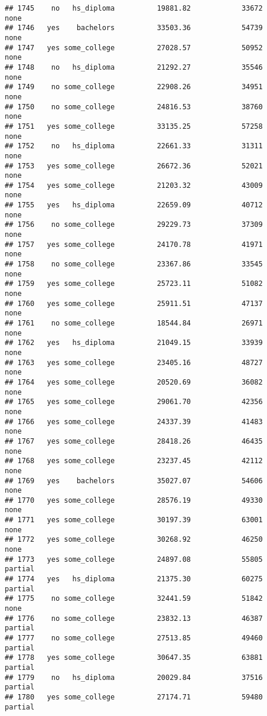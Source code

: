 \documentclass[
]{article}
\begin{document}
\begin{verbatim}
## 1745    no   hs_diploma          19881.82            33672        none
## 1746   yes    bachelors          33503.36            54739        none
## 1747   yes some_college          27028.57            50952        none
## 1748    no   hs_diploma          21292.27            35546        none
## 1749    no some_college          22908.26            34951        none
## 1750    no some_college          24816.53            38760        none
## 1751   yes some_college          33135.25            57258        none
## 1752    no   hs_diploma          22661.33            31311        none
## 1753   yes some_college          26672.36            52021        none
## 1754   yes some_college          21203.32            43009        none
## 1755   yes   hs_diploma          22659.09            40712        none
## 1756    no some_college          29229.73            37309        none
## 1757   yes some_college          24170.78            41971        none
## 1758    no some_college          23367.86            33545        none
## 1759   yes some_college          25723.11            51082        none
## 1760   yes some_college          25911.51            47137        none
## 1761    no some_college          18544.84            26971        none
## 1762   yes   hs_diploma          21049.15            33939        none
## 1763   yes some_college          23405.16            48727        none
## 1764   yes some_college          20520.69            36082        none
## 1765   yes some_college          29061.70            42356        none
## 1766   yes some_college          24337.39            41483        none
## 1767   yes some_college          28418.26            46435        none
## 1768   yes some_college          23237.45            42112        none
## 1769   yes    bachelors          35027.07            54606        none
## 1770   yes some_college          28576.19            49330        none
## 1771   yes some_college          30197.39            63001        none
## 1772   yes some_college          30268.92            46250        none
## 1773   yes some_college          24897.08            55805     partial
## 1774   yes   hs_diploma          21375.30            60275     partial
## 1775    no some_college          32441.59            51842        none
## 1776    no some_college          23832.13            46387     partial
## 1777    no some_college          27513.85            49460     partial
## 1778   yes some_college          30647.35            63881     partial
## 1779    no   hs_diploma          20029.84            37516     partial
## 1780   yes some_college          27174.71            59480     partial

\end{verbatim}
\end{document}
